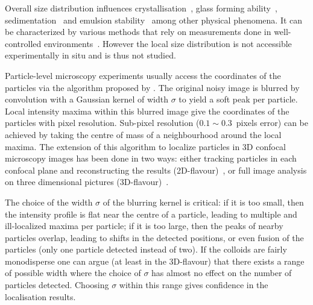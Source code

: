 \documentclass[8.5pt,twoside,twocolumn]{article}
\begin{document}
Overall size distribution influences crystallisation~\cite{Pusey1987,Henderson1996,Fasolo2003,Schope2007,pusey2009hard}, glass forming ability~\cite{Pusey1987,Henderson1996,Senkov2001,Schope2007,pusey2009hard}, sedimentation~\cite{Binks1998,Leocmach2010} and emulsion stability~\cite{Biben1993,Binks1998} among other physical phenomena. It can be characterized by various methods that rely on measurements done in well-controlled environments~\cite{Lange1995,Provder1997,Finder2004}. However the local size distribution is not accessible experimentally in situ and is thus not studied.

Particle-level microscopy experiments usually access the coordinates of the particles via the algorithm proposed by \citet{Crocker1996}. The original noisy image is blurred by convolution with a Gaussian kernel of width $\sigma$ to yield a soft peak per particle. Local intensity maxima within this blurred image give the coordinates of the particles with pixel resolution. Sub-pixel resolution ($0.1\sim0.3$~pixels error) can be achieved by taking the centre of mass of a neighbourhood around the local maxima. The extension of this algorithm to localize particles in 3D confocal microscopy images has been done in two ways: either tracking particles in each confocal plane and reconstructing the results (2D-flavour)~\citep{vanblaaderen1995rss, Lu2007}, or full image analysis on three dimensional pictures (3D-flavour)~\citep{dinsmore2001tdc}.

The choice of the width $\sigma$ of the blurring kernel is critical: if it is too small, then the intensity profile is flat near the centre  of a particle, leading to multiple and ill-localized maxima per particle; if it is too large, then the peaks of nearby particles overlap, leading to shifts in the detected positions, or even fusion of the particles (only one particle detected instead of two). If the colloids are fairly monodisperse one can argue (at least in the 3D-flavour) that there exists a range of possible width where the choice of $\sigma$ has almost no effect on the number of particles detected. Choosing $\sigma$ within this range gives confidence in the localisation results.
\end{document}
